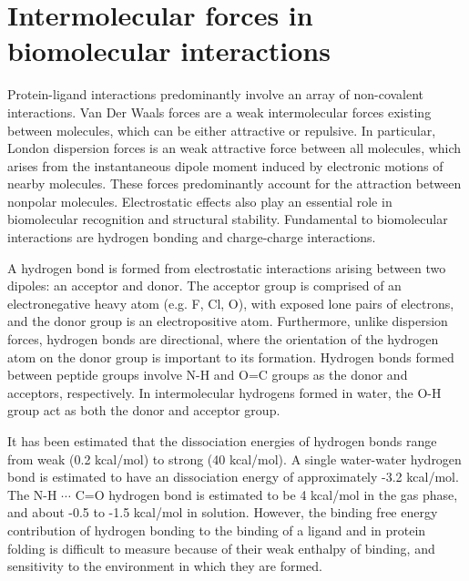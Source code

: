 \section{Intermolecular forces in biomolecular interactions}



Protein-ligand interactions predominantly involve an array of non-covalent interactions.  Van Der Waals forces are a weak intermolecular forces existing between molecules, which can be either attractive or repulsive. In particular, London dispersion forces is an weak attractive force between all molecules, which arises from the instantaneous dipole moment induced by electronic motions of nearby molecules. These forces predominantly account for the attraction between nonpolar molecules.  Electrostatic effects also play an essential role in biomolecular recognition and structural stability. Fundamental to biomolecular interactions are hydrogen bonding and charge-charge interactions.\cite{Nakamura:1996vm}

A hydrogen bond is formed from electrostatic interactions arising between two dipoles: an acceptor and donor.   The acceptor group is comprised of an electronegative heavy atom (e.g. F, Cl, O), with exposed lone pairs of electrons, and the donor group is an electropositive atom.  Furthermore, unlike dispersion forces, hydrogen bonds are directional, where the orientation of the hydrogen atom on the donor group is important to its formation. Hydrogen bonds formed between peptide groups involve N-H and O=C groups as the donor and acceptors, respectively.  In intermolecular hydrogens formed in water, the O-H group act as both the donor and acceptor group.

It has been estimated that the dissociation energies of hydrogen bonds range from weak (0.2 kcal/mol) to strong (40 kcal/mol).\cite{Steiner:2002tb} A single water-water hydrogen bond is estimated to have an dissociation energy of approximately -3.2 kcal/mol.\cite{Steiner:2002tb}  The N-H $\cdots$ C=O hydrogen bond is estimated to be 4 kcal/mol in the gas phase,\cite{Klotz:1993fk} and about -0.5 to -1.5 kcal/mol in solution.\cite{Williams:1993wk} %
However, the binding free energy contribution of hydrogen bonding to the binding of a ligand and in protein folding is difficult to measure because of their weak enthalpy of binding, and sensitivity to the environment in which they are formed.\cite{Klotz:1993fk}

